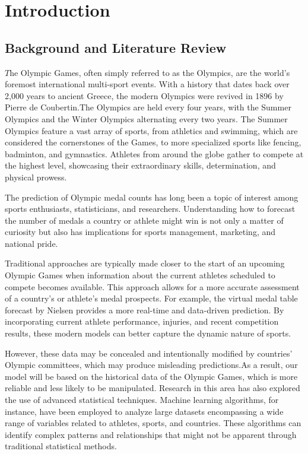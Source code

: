 \section{Introduction}

\subsection{Background and Literature Review}

$T$he Olympic Games, often simply referred to as the Olympics, are the world's foremost international multi-sport events. With a history that dates back over 2,000 years to ancient Greece, the modern Olympics were revived in 1896 by Pierre de Coubertin.The Olympics are held every four years, with the Summer Olympics and the Winter Olympics alternating every two years. The Summer Olympics feature a vast array of sports, from athletics and swimming, which are considered the cornerstones of the Games, to more specialized sports like fencing, badminton, and gymnastics. Athletes from around the globe gather to compete at the highest level, showcasing their extraordinary skills, determination, and physical prowess.

The prediction of Olympic medal counts has long been a topic of interest among sports enthusiasts, statisticians, and researchers. Understanding how to forecast the number of medals a country or athlete might win is not only a matter of curiosity but also has implications for sports management, marketing, and national pride. 

Traditional approaches are typically made closer to the start of an upcoming Olympic Games when information about the current athletes scheduled to compete becomes available. This approach allows for a more accurate assessment of a country's or athlete's medal prospects\cite{3}. For example, the virtual medal table forecast by Nielsen \cite{1} provides a more real-time and data-driven prediction. By incorporating current athlete performance, injuries, and recent competition results, these modern models can better capture the dynamic nature of sports.

However, these data may be concealed and intentionally modified by countries' Olympic committees\cite{5}, which may produce misleading predictions.As a result, our model will be based on the historical data of the Olympic Games, which is more reliable and less likely to be manipulated.
Research in this area has also explored the use of advanced statistical techniques. Machine learning algorithms, for instance, have been employed to analyze large datasets encompassing a wide range of variables related to athletes, sports, and countries. These algorithms can identify complex patterns and relationships that might not be apparent through traditional statistical methods.


